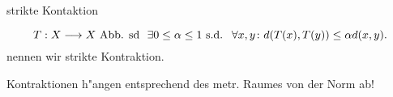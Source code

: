 \documentclass[class=article, crop=false]{standalone}
\begin{document}
\begin{zettel}{strikte Kontaktion}
\begin{flashcard}[]{}
	\begin{definition}
		\[
			T : X \longrightarrow X \tx{Abb. sd} \exists  0 \leq \alpha \leq  1 \text{ s.d. } \forall x,y \colon d(T(x) ,T(y) ) \leq \alpha d(x,y)
		.\]
		nennen wir strikte Kontraktion.

	\end{definition}
	\begin{remark}
		Kontraktionen h"angen entsprechend des metr. Raumes von der Norm ab!
	\end{remark}
\end{flashcard}
\end{zettel}
\end{document}
